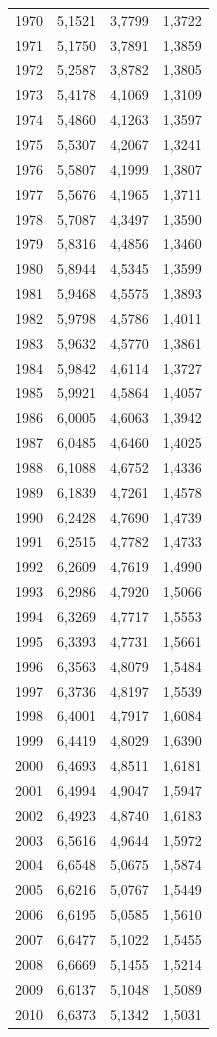 \begin{longtable}{@{}p{}rrr@{}}
1970 & 5,1521 & 3,7799 & 1,3722 \\
1971 & 5,1750 & 3,7891 & 1,3859 \\
1972 & 5,2587 & 3,8782 & 1,3805 \\
1973 & 5,4178 & 4,1069 & 1,3109 \\
1974 & 5,4860 & 4,1263 & 1,3597 \\
1975 & 5,5307 & 4,2067 & 1,3241 \\
1976 & 5,5807 & 4,1999 & 1,3807 \\
1977 & 5,5676 & 4,1965 & 1,3711 \\
1978 & 5,7087 & 4,3497 & 1,3590 \\
1979 & 5,8316 & 4,4856 & 1,3460 \\
1980 & 5,8944 & 4,5345 & 1,3599 \\
1981 & 5,9468 & 4,5575 & 1,3893 \\
1982 & 5,9798 & 4,5786 & 1,4011 \\
1983 & 5,9632 & 4,5770 & 1,3861 \\
1984 & 5,9842 & 4,6114 & 1,3727 \\
1985 & 5,9921 & 4,5864 & 1,4057 \\
1986 & 6,0005 & 4,6063 & 1,3942 \\
1987 & 6,0485 & 4,6460 & 1,4025 \\
1988 & 6,1088 & 4,6752 & 1,4336 \\
1989 & 6,1839 & 4,7261 & 1,4578 \\
1990 & 6,2428 & 4,7690 & 1,4739 \\
1991 & 6,2515 & 4,7782 & 1,4733 \\
1992 & 6,2609 & 4,7619 & 1,4990 \\
1993 & 6,2986 & 4,7920 & 1,5066 \\
1994 & 6,3269 & 4,7717 & 1,5553 \\
1995 & 6,3393 & 4,7731 & 1,5661 \\
1996 & 6,3563 & 4,8079 & 1,5484 \\
1997 & 6,3736 & 4,8197 & 1,5539 \\
1998 & 6,4001 & 4,7917 & 1,6084 \\
1999 & 6,4419 & 4,8029 & 1,6390 \\
2000 & 6,4693 & 4,8511 & 1,6181 \\
2001 & 6,4994 & 4,9047 & 1,5947 \\
2002 & 6,4923 & 4,8740 & 1,6183 \\
2003 & 6,5616 & 4,9644 & 1,5972 \\
2004 & 6,6548 & 5,0675 & 1,5874 \\
2005 & 6,6216 & 5,0767 & 1,5449 \\
2006 & 6,6195 & 5,0585 & 1,5610 \\
2007 & 6,6477 & 5,1022 & 1,5455 \\
2008 & 6,6669 & 5,1455 & 1,5214 \\
2009 & 6,6137 & 5,1048 & 1,5089 \\
2010 & 6,6373 & 5,1342 & 1,5031 \\

\end{longtable}
\normalsize